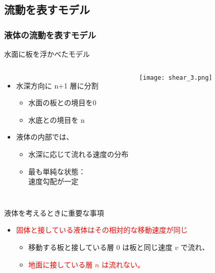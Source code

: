 \documentclass[12pt, dvipdfmx]{beamer}
\begin{document}
\subsection{流動を表すモデル}
\begin{frame}
	\frametitle{液体の流動を表すモデル}
	\begin{exampleblock}{水面に板を浮かべたモデル}
		\begin{columns}[T, onlytextwidth]
				\begin{itemize}
					\item 水深方向に n+1 層に分割
						\begin{itemize}
							\item 水面の板との境目を0
							\item 水底との境目を n 
						\end{itemize}
						\item 液体の内部では、
						\begin{itemize}
							\item 水深に応じて流れる速度の分布
							\item 最も単純な状態：\\速度勾配が一定
						\end{itemize}
				\end{itemize}
				\begin{center}
					\texttt{[image: shear\_3.png]}
				\end{center}
		\end{columns}
	\end{exampleblock}
	\begin{block}{液体を考えるときに重要な事項}
		\begin{itemize}
			\item \textcolor{red}{固体と接している液体はその相対的な移動速度が同じ}
			\begin{itemize}
				\item 移動する板と接している\alert{層 0 は板と同じ速度 $v$ で流れ、}
				\item \textcolor{red}{地面に接している層 $n$ は流れない。}
			\end{itemize}
		\end{itemize}
	\end{block}
\end{frame}
\end{document}
